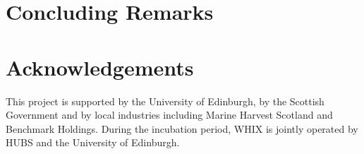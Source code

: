 \documentclass{sig-alternate-10pt}
\begin{document}

\section{Concluding Remarks} \label{sec:conc} 

\section{Acknowledgements}
This project is supported by the University of Edinburgh, by the Scottish Government and by local industries including Marine Harvest Scotland and Benchmark Holdings. 
During the incubation period, \ac{WHIX} is jointly
operated by HUBS and the University of Edinburgh.

\listoftodos



\end{document}
